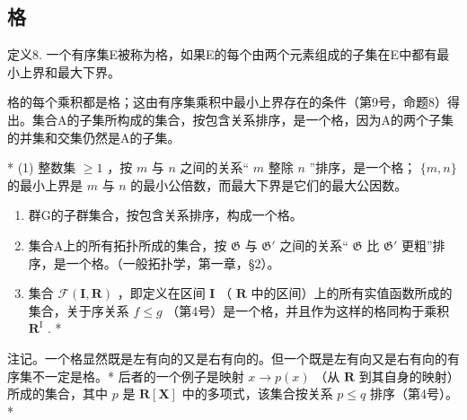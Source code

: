 \subsection{格}

定义8. 一个有序集E被称为格，如果E的每个由两个元素组成的子集在E中都有最小上界和最大下界。

格的每个乘积都是格；这由有序集乘积中最小上界存在的条件（第9号，命题8）得出。集合A的子集所构成的集合，按包含关系排序，是一个格，因为A的两个子集的并集和交集仍然是A的子集。


* (1) 整数集 \(\geqslant 1\) ，按 \(m\) 与 \(n\) 之间的关系“ \(m\) 整除 \(n\) ”排序，是一个格； \(\{m, n\}\) 的最小上界是 \(m\) 与 \(n\) 的最小公倍数，而最大下界是它们的最大公因数。

\begin{enumerate}
\def\labelenumi{(\arabic{enumi})}
\setcounter{enumi}{1}
\item
  群G的子群集合，按包含关系排序，构成一个格。
\item
  集合A上的所有拓扑所成的集合，按 \(\mathfrak{G}\) 与 \(\mathfrak{G}'\) 之间的关系“ \(\mathfrak{G}\) 比 \(\mathfrak{G}'\) 更粗”排序，是一个格。（一般拓扑学，第一章，§2）。
\item
  集合 \(\mathcal{F}(\mathbf{I},\mathbf{R})\) ，即定义在区间 \(\mathbf{I}\) （ \(\mathbf{R}\) 中的区间）上的所有实值函数所成的集合，关于序关系 \(f\leqslant g\) （第4号）是一个格，并且作为这样的格同构于乘积 \(\mathbf{R}^{\mathrm{I}}\) . *
\end{enumerate}

注记。一个格显然既是左有向的又是右有向的。但一个既是左有向又是右有向的有序集不一定是格。* 后者的一个例子是映射 \(x \to p(x)\) （从 \(\mathbf{R}\) 到其自身的映射）所成的集合，其中 \(p\) 是 \(\mathbf{R}[\mathbf{X}]\) 中的多项式，该集合按关系 \(p \leqslant q\) 排序（第4号）。*

